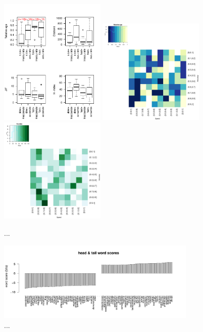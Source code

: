 \documentclass[fleqn,10pt]{SelfArx} %
\begin{document}
\begin{figure}[H]
\centering
\includegraphics[width=0.45\textwidth]{relAge-speedAcc.pdf}
\includegraphics[width=0.45\textwidth]{relAge-SpeedVsAccuracy-heatmap.pdf}\\
\includegraphics[width=0.45\textwidth]{hindex-SpeedVsAccuracy-heatmap.pdf}
\caption{...}
\label{fig:S4}
\end{figure}


\begin{figure}[H]
\centering
\includegraphics[width=0.85\textwidth]{wordScores.pdf}
\caption{...}
\label{fig:S5}
\end{figure}




\end{document}
